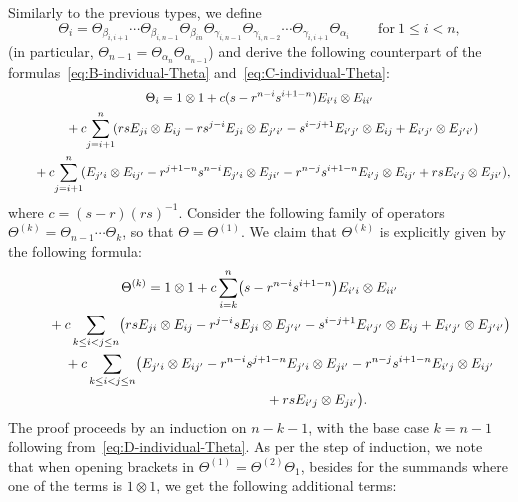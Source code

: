 \documentclass[10pt,a4paper]{amsart}
\numberwithin{equation}{section}
\begin{document}
Similarly to the previous types, we define
\begin{displaymath}
 \Theta_{i} = \Theta_{\beta_{i,i+1}}\cdots \Theta_{\beta_{i,n-1}}\Theta_{\beta_{in}}
 \Theta_{\gamma_{i,n-1}}\Theta_{\gamma_{i,n-2}}\cdots \Theta_{\gamma_{i,i+1}}\Theta_{\alpha_{i}}
 \qquad \mathrm{for} \ 1 \le i < n,
\end{displaymath}
 (in particular, $\Theta_{n-1}=\Theta_{\alpha_n}\Theta_{\alpha_{n-1}}$) and derive the following counterpart of the formulas~\eqref{eq:B-individual-Theta} and~\eqref{eq:C-individual-Theta}:
\begin{gather}
 \Theta_{i} = 1 \otimes 1 + c(s - r^{n - i}s^{i + 1 - n})E_{i'i} \otimes E_{ii'}\label{eq:D-individual-Theta} \\
 \hphantom{\Theta_{i} =}{}
 \!+ c\!\sum_{j = i + 1}^{n}\!(rsE_{ji} \otimes E_{ij} - rs^{j - i}E_{ji} \otimes E_{j'i'} - s^{i - j + 1}E_{i'j'} \otimes E_{ij} + E_{i'j'} \otimes E_{j'i'})\nonumber \\
 \hphantom{\Theta_{i} =}{}
 \!+ c\!\sum_{j = i + 1}^{n}\!(E_{j'i} \otimes E_{ij'} - r^{j + 1 - n}s^{n - i}E_{j'i} \otimes E_{ji'} - r^{n - j}s^{i + 1 - n}E_{i'j} \otimes E_{ij'} + rsE_{i'j} \otimes E_{ji'}),\nonumber
\end{gather}
where $c = (s - r)(rs)^{-1}$. Consider the following family of operators $\Theta^{(k)}=\Theta_{n-1} \cdots \Theta_{k}$, so that $\Theta=\Theta^{(1)}$. We claim that $\Theta^{(k)}$ is explicitly given by the following formula:
{\samepage\begin{gather}
 \Theta^{(k)} = 1 \otimes 1 + c \sum_{i = k}^{n}\bigl(s - r^{n - i}s^{i + 1 - n}\bigr)E_{i'i} \otimes E_{ii'}\nonumber \\
 \hphantom{\Theta^{(k)} =}{}
 + c\sum_{k \le i < j \le n}\bigl(rsE_{ji} \otimes E_{ij} - r^{j - i}s E_{ji} \otimes E_{j'i'} - s^{i - j + 1}E_{i'j'} \otimes E_{ij} + E_{i'j'} \otimes E_{j'i'}\bigr)\nonumber \\
 \hphantom{\Theta^{(k)} =}{}
 + c\sum_{k \le i < j \le n}\bigl(E_{j'i} \otimes E_{ij'} - r^{n - i}s^{j + 1- n}E_{j'i} \otimes E_{ji'} - r^{n - j}s^{i+ 1 - n}E_{i'j} \otimes E_{ij'}\nonumber\\
 \hphantom{\Theta^{(k)} =+ c\sum_{k \le i < j \le n}\bigl(}{}
 + rsE_{i'j} \otimes E_{ji'}\bigr).\label{eq:D-Theta_k}
\end{gather}
The proof proceeds by an induction on $n-k - 1$, with the base case $k=n-1$ following from~\eqref{eq:D-individual-Theta}.}
As per the step of induction, we note that when opening brackets in $\Theta^{(1)}=\Theta^{(2)}\Theta_1$, besides for the summands where one of the terms is $1\otimes 1$, we get the following additional terms:
\end{document}
